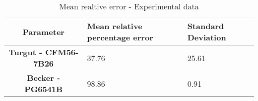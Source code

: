 \begin{table}[h!]
  \centering
  \begin{tabularx}{\textwidth}{||c|X|X||}
  \hline
    \cellcolor{gray!20}\textbf{Parameter} & \cellcolor{gray!20}\textbf{Mean relative percentage error} & \cellcolor{gray!20}\textbf{Standard Deviation} \\ [0.5ex]
  \hline\hline
\centering
    \cellcolor{gray!20}\textbf{Turgut - CFM56-7B26} & 37.76 & 25.61 \\
  \hline
    \cellcolor{gray!20}\textbf{Becker - PG6541B} & 98.86 & 0.91 \\
  \hline
  \end{tabularx}
  \caption{Mean realtive error - Experimental data}
  \label{meanEE}
\end{table}
